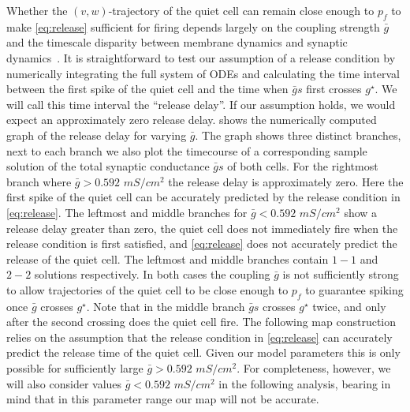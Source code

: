 \documentclass[utf8,draft]{frontiersFPHY} %
\newcommand{\gbar}{\bar g}
\begin{document}
Whether the $(v,w)$-trajectory of the quiet cell can remain close enough to $p_{f}$ to make \cref{eq:release} sufficient for firing depends largely on the coupling strength $\gbar$ and the timescale disparity between membrane dynamics and synaptic dynamics~\citep{bose2011}.
It is straightforward to test our assumption of a release condition by numerically integrating the full system of ODEs and calculating the time interval between the first spike of the quiet cell and the time when $\gbar s$ first crosses $g^{\star}$.
We will call this time interval the ``release delay''.
If our assumption holds, we would expect an approximately zero release delay.
 shows the numerically computed graph of the release delay for varying $\gbar$.
The graph shows three distinct branches, next to each branch we also plot the timecourse of a corresponding sample solution of the total synaptic conductance $\gbar s$ of both cells.
For the rightmost branch where $\gbar>0.592$ $\si{mS/cm^{2}}$ the release delay is approximately zero.
Here the first spike of the quiet cell can be accurately predicted by the release condition in \cref{eq:release}.
The leftmost and middle branches for $\gbar<0.592$ $\si{mS/cm^{2}}$  show a release delay greater than zero, the quiet cell does not immediately fire when the release condition is first satisfied, and \cref{eq:release} does not accurately predict the release of the quiet cell.
The leftmost and middle branches contain $1-1$ and $2-2$ solutions respectively.
In both cases the coupling $\gbar$ is not sufficiently strong to allow trajectories of the quiet cell to be close enough to $p_{f}$ to guarantee spiking once $\gbar$ crosses $g^{\star}$.
Note that in the middle branch $\gbar s $ crosses $g^{\star}$ twice, and only after the second crossing does the quiet cell fire.
The following map construction relies on the assumption that the release condition in \cref{eq:release} can accurately predict the release time of the quiet cell.
Given our model parameters this is only possible for sufficiently large $\gbar>0.592 $ $\si{mS/cm^{2}}$.
For completeness, however, we will also consider values $\gbar < 0.592$ $\si{mS/cm^{2}}$ in the following analysis, bearing in mind that in this parameter range our map will not be accurate.
\end{document}
